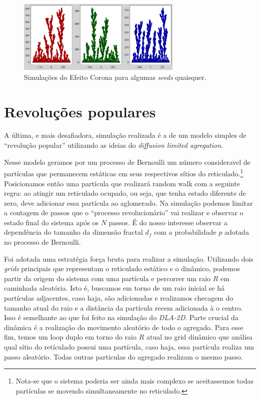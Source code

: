 \documentclass[a4paper, 11pt]{tufte-handout}
\begin{document}
\begin{figure}
  \centering
  \includegraphics[width=0.7\textwidth]{tarefa-4/efeito-corona.png}
  \caption{Simulações do Efeito Corona para algumas \emph{seeds} quaisquer.}
\end{figure}


\clearpage
\section{Revoluções populares}

A última, e mais desafiadora, simulação realizada é a de um modelo simples de ``revolução popular''
utilizando as ideias do \emph{diffusion limited agregation}.

Nesse modelo geramos por um processo de Bernoulli um número consideravel de partículas que
permanecem estáticas em seus respectivos sítios do reticulado.\footnote{Nota-se que o sistema
  poderia ser ainda mais complexo se aceitassemos todas partículas se movendo simultaneamente no
  reticulado.} Posicionamos então uma partícula que realizará random walk com a seguinte regra: ao
atingir um reticulado ocupado, ou seja, que tenha estado diferente de zero, deve adicionar essa
partícula ao aglomerado. Na simulação podemos limitar a contagem de passos que o ``processo
revolucionário'' vai realizar e observar o estado final do sistema após os $N$ passos.
É do nosso interesse observar a dependência do tamanho da dimensão fractal \( d_f \) com a
probabilidade \( p \) adotada no processo de Bernoulli. 


Foi adotada uma estratégia força bruta para realizar a simulação. Utilizando dois \emph{grids}
principais que representam o reticulado estático e o dinâmico, podemos partir da origem do sistema
com uma partícula e percorrer um raio $R$ em caminhada aleatória. Isto é, buscamos em torno de um
raio inicial se há partículas adjacentes, caso haja, são adicionadas e realizamos checagem do
tamanho atual do raio e a distância da partícula recem adicionada à o centro. Isso é semelhante ao
que foi feito na simulação do \emph{DLA-2D}.
Parte crucial da dinâmica é a realização do movimento
aleatório de todo o agregado. Para esse fim, temos um loop duplo em torno do raio $R$ atual no grid
dinâmico que análisa qual sítio do retículado possui uma partícula, caso haja, essa partícula
realiza um passo aleatório. Todas outras particulas do agregado realizam o mesmo passo.
\end{document}
